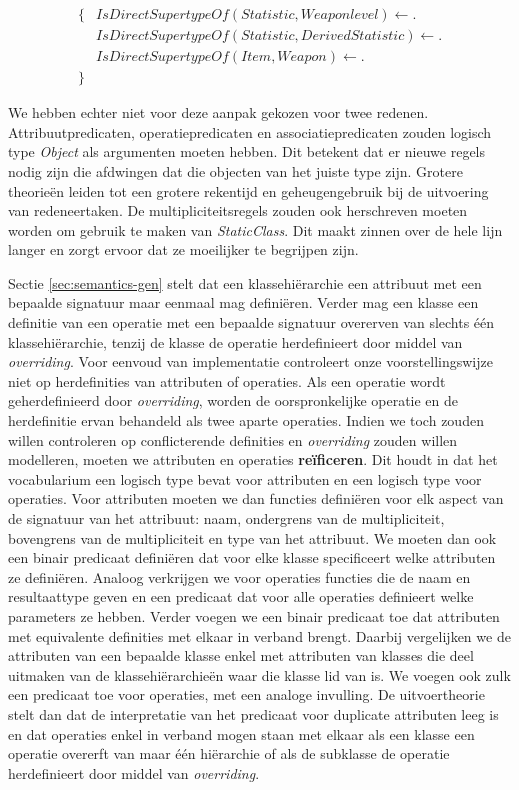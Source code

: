 \begin{align*}
\{
&\mathit{IsDirectSupertypeOf}(Statistic,Weaponlevel) \leftarrow .\\
&\mathit{IsDirectSupertypeOf}(Statistic,DerivedStatistic) \leftarrow .\\
&\mathit{IsDirectSupertypeOf}(Item,Weapon) \leftarrow .\\
\}
\end{align*}

We hebben echter niet voor deze aanpak gekozen voor twee redenen.
Attribuutpredicaten, operatiepredicaten en associatiepredicaten zouden logisch type \textit{Object} als argumenten moeten hebben. Dit betekent dat er nieuwe regels nodig zijn die afdwingen dat die objecten van het juiste type zijn. Grotere theorie\"en leiden tot een grotere rekentijd en geheugengebruik bij de uitvoering van redeneertaken.
De multipliciteitsregels zouden ook herschreven moeten worden om gebruik te maken van \textit{StaticClass}. Dit maakt zinnen over de hele lijn langer en zorgt ervoor dat ze moeilijker te begrijpen zijn.

Sectie \ref{sec:semantics-gen} stelt dat een klassehi\"erarchie een attribuut met een bepaalde signatuur maar eenmaal mag defini\"eren. Verder mag een klasse een definitie van een operatie met een bepaalde signatuur overerven van slechts \'e\'en klassehi\"erarchie, tenzij de klasse de operatie herdefinieert door middel van \textit{overriding}. Voor eenvoud van implementatie controleert onze voorstellingswijze niet op herdefinities van attributen of operaties. Als een operatie wordt geherdefinieerd door \textit{overriding}, worden de oorspronkelijke operatie en de herdefinitie ervan behandeld als twee aparte operaties. Indien we toch zouden willen controleren op conflicterende definities en \textit{overriding} zouden willen modelleren, moeten we attributen en operaties \textbf{re\"ificeren}. Dit houdt in dat het vocabularium een logisch type bevat voor attributen en een logisch type voor operaties. Voor attributen moeten we dan functies defini\"eren voor elk aspect van de signatuur van het attribuut: naam, ondergrens van de multipliciteit, bovengrens van de multipliciteit en type van het attribuut. We moeten dan ook een binair predicaat defini\"eren dat voor elke klasse specificeert welke attributen ze defini\"eren. Analoog verkrijgen we voor operaties functies die de naam en resultaattype geven en een predicaat dat voor alle operaties definieert welke parameters ze hebben. Verder voegen we een binair predicaat toe dat attributen met equivalente definities met elkaar in verband brengt. Daarbij vergelijken we de attributen van een bepaalde klasse enkel met attributen van klasses die deel uitmaken van de klassehi\"erarchie\"en waar die klasse lid van is. We voegen ook zulk een predicaat toe voor operaties, met een analoge invulling. De uitvoertheorie stelt dan dat de interpretatie van het predicaat voor duplicate attributen leeg is en dat operaties enkel in verband mogen staan met elkaar als een klasse een operatie overerft van maar \'e\'en hi\"erarchie of als de subklasse de operatie herdefinieert door middel van \textit{overriding}.

